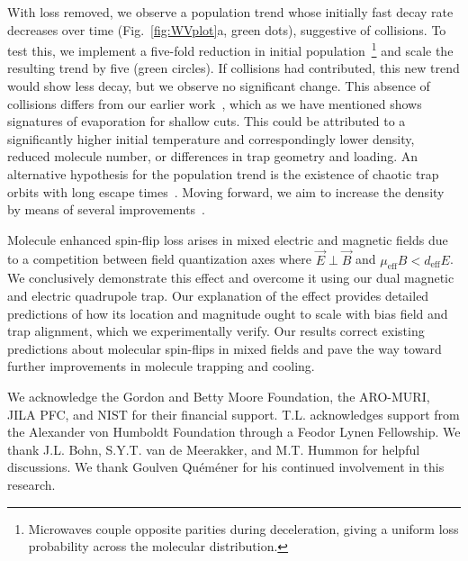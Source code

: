 \documentclass[%
 reprint,
 amsmath,amssymb,
 aps,
prl,
]{revtex4-1}
\newcommand{\red}[1]{{\color{black} #1}}
\newcommand{\epb}{{$\vec{E}\!\perp\!\vec{B}$}}
\begin{document}
With loss removed, we observe a population trend whose initially fast decay rate decreases over time (Fig.~\ref{fig:WVplot}a, green dots), suggestive of collisions. 
To test this, we implement a five-fold reduction in initial population~\footnote{Microwaves couple opposite parities during deceleration, giving a uniform loss probability across the molecular distribution.} and scale the resulting trend by five (green circles). 
If collisions had contributed, this new trend would show less decay, but we observe no significant change. 
This absence of collisions differs from our earlier work~\cite{Stuhl2012evap}, which as we have mentioned shows signatures of evaporation for shallow cuts. 
This could be attributed to a significantly higher initial temperature and correspondingly lower density, reduced molecule number, or differences in trap geometry and loading. 
\red{An alternative hypothesis for the population trend is the existence of chaotic trap orbits with long escape times~\cite{Gonzalez-Ferez2014}.} 
Moving forward, we aim to increase the density by means of several improvements~\cite{Even2015,Segev2017}.

Molecule enhanced spin-flip loss arises in mixed electric and magnetic fields due to a competition between field quantization axes where \epb{} and $\mu_\text{eff}B<d_\text{eff}E$. 
We conclusively demonstrate this effect and overcome it using our dual magnetic and electric quadrupole trap. 
Our explanation of the effect provides detailed predictions of how its location and magnitude ought to scale with bias field and trap alignment, which we experimentally verify. 
Our results correct existing predictions about molecular spin-flips in mixed fields and pave the way toward further improvements in molecule trapping and cooling.

\begin{acknowledgments}
We acknowledge the Gordon and Betty Moore Foundation, the ARO-MURI, JILA PFC, and NIST for their financial support. 
T.L. acknowledges support from the Alexander von Humboldt Foundation through a Feodor Lynen Fellowship. 
We thank J.L. Bohn, S.Y.T. van de Meerakker, and M.T. Hummon for helpful discussions. 
We thank Goulven Qu\'em\'ener for his continued involvement in this research.
\end{acknowledgments}



\end{document}
